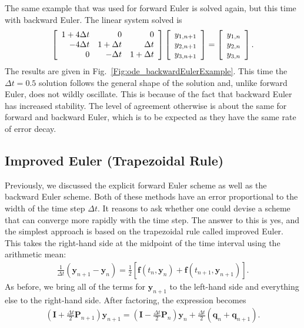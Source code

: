 The same example that was used for forward Euler is solved again, but this time with backward Euler. The linear system  solved is
\begin{align}
  \left[ \begin{array}{r r r}
   1 + 4\Delta t &             0 &             0 \\
      -4\Delta t &  1 + \Delta t &      \Delta t \\
               0 &     -\Delta t &  1 + \Delta t \\ \end{array} \right]  
  \left[ \begin{array}{c} y_{1,n+1} \\ y_{2,n+1} \\ y_{3,n+1} \end{array} \right] =
  \left[ \begin{array}{c} y_{1,n} \\ y_{2,n} \\ y_{3,n} \end{array} \right] .
\end{align}
The results are given in Fig.~\ref{Fig:ode_backwardEulerExample}. This time the $\Delta t = 0.5$ solution follows the general shape of the solution and, unlike forward Euler, does not wildly oscillate. This is because of the fact that backward Euler has increased stability. The level of agreement otherwise is about the same for forward and backward Euler, which is to be expected as they have the same rate of error decay.

\subsection{Improved Euler (Trapezoidal Rule)}

Previously, we discussed the explicit forward Euler scheme as well as the backward Euler scheme. Both of these methods have an error proportional to the width of the time step $\Delta t$. It reasons to ask whether one could devise a scheme that can converge more rapidly with the time step. The answer to this is yes, and the simplest approach is based on the trapezoidal rule called improved Euler. This takes the right-hand side at the midpoint of the time interval using the arithmetic mean:
\begin{align}
   \frac{1}{\Delta t}  \left( \mathbf{y}_{n+1} - \mathbf{y}_n \right) = \frac{1}{2} \left[ \mathbf{f}( t_n, \mathbf{y}_n ) + \mathbf{f}( t_{n+1}, \mathbf{y}_{n+1} ) \right].
\end{align}
As before, we bring all of the terms for $\mathbf{y}_{n+1}$ to the left-hand side and everything else to the right-hand side. After factoring, the expression becomes
\begin{align}
  \left( \mathbf{I} + \frac{\Delta t}{2} \mathbf{P}_{n+1} \right) \mathbf{y}_{n+1} = 
  \left( \mathbf{I} - \frac{\Delta t}{2} \mathbf{P}_{n}   \right) \mathbf{y}_n + \frac{\Delta t}{2} \left( \mathbf{q}_n + \mathbf{q}_{n+1} \right) .
\end{align}

